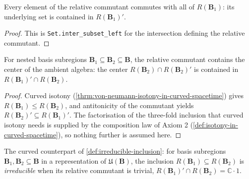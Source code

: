 \begin{theorem}
    \label{thrm:relative-commutant-coe-commutant-in-curved-spacetime}
    \leanok
    Every element of the relative commutant commutes with all of $R(\mathbf{B}_1)$: its underlying set is contained in $R(\mathbf{B}_1)'$.
\end{theorem}
\begin{proof}
    \leanok
    This is \texttt{Set.inter\_subset\_left} for the intersection defining the relative commutant.
\end{proof}

\begin{theorem}
    \label{thrm:relative-commutant-center-in-curved-spacetime}
    \leanok
    For nested basis subregions $\mathbf{B}_1 \subseteq \mathbf{B}_2 \subseteq \mathbf{B}$, the relative commutant contains the center of the ambient algebra: the center $R(\mathbf{B}_2) \cap R(\mathbf{B}_2)'$ is contained in $R(\mathbf{B}_1)' \cap R(\mathbf{B}_2)$.
\end{theorem}
\begin{proof}
    \leanok
    Curved isotony (\ref{thrm:von-neumann-isotony-in-curved-spacetime}) gives $R(\mathbf{B}_1) \le R(\mathbf{B}_2)$, and antitonicity of the commutant yields $R(\mathbf{B}_2)' \subseteq R(\mathbf{B}_1)'$. The factorisation of the three-fold inclusion that curved isotony needs is supplied by the composition law of Axiom 2 (\ref{def:isotony-in-curved-spacetime}), so nothing further is assumed here.
\end{proof}

\begin{definition}
    \label{def:irreducible-inclusion-in-curved-spacetime}
    \leanok
    The curved counterpart of \ref{def:irreducible-inclusion}: for basis subregions $\mathbf{B}_1, \mathbf{B}_2 \subseteq \mathbf{B}$ in a representation of $\mathfrak{U}(\mathbf{B})$, the inclusion $R(\mathbf{B}_1) \subseteq R(\mathbf{B}_2)$ is \emph{irreducible} when its relative commutant is trivial, $R(\mathbf{B}_1)' \cap R(\mathbf{B}_2) = \mathbb{C}\cdot 1$.
\end{definition}

